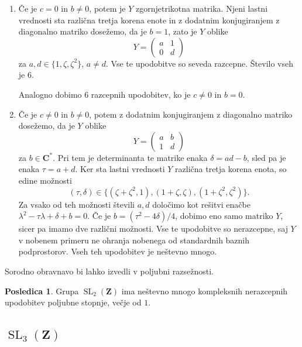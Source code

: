 \documentclass[11pt]{book}
\def\ZZ{\mathbf{Z}}
\def\CC{\mathbf{C}}
\DeclareMathOperator\SL{SL}
\theoremstyle{definition}
\theoremstyle{zgled}
\theoremstyle{zgledbrezstevilke}
\theoremstyle{odprtproblem}
\theoremstyle{domacanaloga}
\theoremstyle{izrek}
\newtheorem{posledica}[theorem]{Posledica}
\begin{document}
\begin{enumerate}
\begin{enumerate}
        \item Če je $c = 0$ in $b \neq 0$, potem je $Y$ zgornjetrikotna matrika. Njeni lastni vrednosti sta različna tretja korena enote in z dodatnim konjugiranjem z diagonalno matriko dosežemo, da je $b = 1$, zato je $Y$ oblike
        \[
            Y = \begin{pmatrix}
                a & 1 \\ 0 & d
            \end{pmatrix}
        \]
        za $a,d\in \{ 1, \zeta, \zeta^2 \}$, $a \neq d$. Vse te upodobitve so seveda razcepne. Število vseh je $6$.

        Analogno dobimo $6$ razcepnih upodobitev, ko je $c \neq 0$ in $b = 0$.

        \item Če je $c \neq 0$ in $b \neq 0$, potem z dodatnim konjugiranjem z diagonalno matriko dosežemo, da je $Y$ oblike
        \[
            Y = \begin{pmatrix}
                a & b \\ 1 & d
            \end{pmatrix}            
        \]
        za $b \in \CC^*$. Pri tem je determinanta te matrike enaka $\delta = ad-b$, sled pa je enaka $\tau = a + d$. Ker sta lastni vrednosti $Y$ različna tretja korena enota, so edine možnosti
        \[
            (\tau, \delta) \in \{ (\zeta + \zeta^2, 1), (1 + \zeta, \zeta), (1 + \zeta^2, \zeta^2) \}.
        \]
        Za vsako od teh možnosti števili $a,d$ določimo kot rešitvi enačbe $\lambda^2 - \tau \lambda + \delta + b = 0$. Če je $b = (\tau^2 - 4 \delta)/4$, dobimo eno samo matriko $Y$, sicer pa imamo dve različni možnosti. Vse te upodobitve so nerazcepne, saj $Y$ v nobenem primeru ne ohranja nobenega od standardnih baznih podprostorov. Vseh teh upodobitev je neštevno mnogo.
    \end{enumerate}
\end{enumerate}

Sorodno obravnavo bi lahko izvedli v poljubni razsežnosti.

\begin{posledica}
Grupa $\SL_2(\ZZ)$ ima neštevno mnogo kompleksnih nerazcepnih upodobitev poljubne stopnje, večje od $1$.
\end{posledica}

\subsection{$\SL_3(\ZZ)$}
\end{document}
